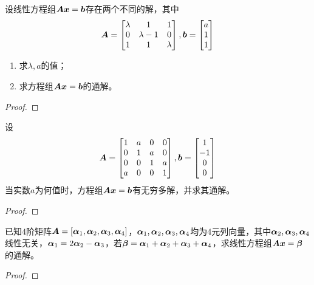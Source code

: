 \begin{problem}\label{problem-2.11}
设线性方程组\(\boldsymbol{A}\boldsymbol{x}=\boldsymbol{b}\)存在两个不同的解，其中
\begin{equation*}
    \boldsymbol{A}=
    \begin{bmatrix}
        \lambda & 1         & 1       \\
        0       & \lambda-1 & 0       \\
        1       & 1         & \lambda
    \end{bmatrix},
    \boldsymbol{b}=
    \begin{bmatrix}
        a \\1\\1
    \end{bmatrix}
\end{equation*}
\begin{enumerate}
    \item 求\(\lambda,a\)的值；
    \item 求方程组\(\boldsymbol{A}\boldsymbol{x}=\boldsymbol{b}\)的通解。
\end{enumerate}
\end{problem}
\begin{proof}
\end{proof}

\begin{problem}\label{problem-2.12}
设
\begin{equation*}
    \boldsymbol{A}=
    \begin{bmatrix}
        1 & a & 0 & 0 \\
        0 & 1 & a & 0 \\
        0 & 0 & 1 & a \\
        a & 0 & 0 & 1
    \end{bmatrix},
    \boldsymbol{b}=
    \begin{bmatrix}
        1 \\-1\\0\\0
    \end{bmatrix}
\end{equation*}
当实数\(a\)为何值时，方程组\(\boldsymbol{A}\boldsymbol{x}=\boldsymbol{b}\)有无穷多解，并求其通解。
\end{problem}
\begin{proof}
\end{proof}

\begin{problem}\label{problem-2.13}
已知\(4\)阶矩阵\(\boldsymbol{A}=\left[ \boldsymbol{\alpha}_1,\boldsymbol{\alpha}_2,\boldsymbol{\alpha}_3,\boldsymbol{\alpha}_4 \right]\)，\(\boldsymbol{\alpha}_1,\boldsymbol{\alpha}_2,\boldsymbol{\alpha}_3,\boldsymbol{\alpha}_4\)均为\(4\)元列向量，其中\(\boldsymbol{\alpha}_2,\boldsymbol{\alpha}_3,\boldsymbol{\alpha}_4\)线性无关，\(\boldsymbol{\alpha}_1=2\boldsymbol{\alpha}_2-\boldsymbol{\alpha}_3\)，若\(\boldsymbol{\beta}=\boldsymbol{\alpha}_1+\boldsymbol{\alpha}_2+\boldsymbol{\alpha}_3+\boldsymbol{\alpha}_4\)，求线性方程组\(\boldsymbol{A}\boldsymbol{x}=\boldsymbol{\beta}\)的通解。
\end{problem}
\begin{proof}
\end{proof}

